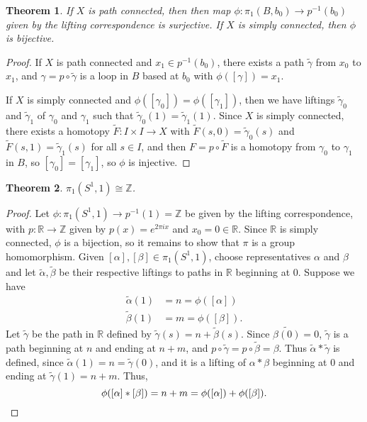 \documentclass[letterpaper,12pt]{article}
\newtheorem{theorem}{Theorem}
\newcommand{\R}{\mathbb{R}}
\newcommand{\Z}{\mathbb{Z}}
\begin{document}
\begin{theorem}
 If $X$ is path connected, then then map $\phi:\pi_1(B,b_0)\to p^{-1}(b_0)$ given by the lifting correspondence is surjective. If $X$ is simply connected, then $\phi$ is bijective.
\end{theorem}
\begin{proof}
 If $X$ is path connected and $x_1\in p^{-1}(b_0)$, there exists a path $\tilde{\gamma}$ from $x_0$ to $x_1$, and $\gamma = p\circ\tilde{\gamma}$ is a loop in $B$ based at $b_0$ with $\phi([\gamma])=x_1$.

 If $X$ is simply connected and $\phi([\gamma_0])=\phi([\gamma_1])$, then we have liftings $\tilde{\gamma}_0$ and $\tilde{\gamma}_1$ of $\gamma_0$ and $\gamma_1$ such that $\tilde{\gamma}_0(1)=\tilde{\gamma}_1(1)$. Since $X$ is simply connected, there exists a homotopy $\tilde{F}:I\times I\to X$ with $\tilde{F}(s,0)=\tilde{\gamma}_0(s)$ and $\tilde{F}(s,1)=\tilde{\gamma}_1(s)$ for all $s\in I$, and then $F = p\circ\tilde{F}$ is a homotopy from $\gamma_0$ to $\gamma_1$ in $B$, so $[\gamma_0]=[\gamma_1]$, so $\phi$ is injective.
\end{proof}
\newpage
\begin{theorem}
 $\pi_1(S^1,1)\cong \Z$.
\end{theorem}
\begin{proof}
 Let $\phi:\pi_1(S^1,1)\to p^{-1}(1)=\Z$ be given by the lifting correspondence, with $p:\R\to \Z$ given by $p(x)=e^{2\pi i x}$ and $x_0=0\in \R$. Since $\R$ is simply connected, $\phi$ is a bijection, so it remains to show that $\pi$ is a group homomorphism. Given $[\alpha],[\beta]\in \pi_1(S^1,1)$, choose representatives $\alpha$ and $\beta$ and let $\tilde{\alpha},\tilde{\beta}$ be their respective liftings to paths in $\R$ beginning at $0$. Suppose we have
\begin{align*}
 \tilde{\alpha}(1) &= n = \phi([\alpha])\\
 \tilde{\beta}(1) &= m = \phi([\beta]).
\end{align*}
Let $\tilde{\gamma}$ be the path in $\R$ defined by $\tilde{\gamma}(s) = n+\tilde{\beta}(s)$. Since $\tilde{\beta(0)}=0$, $\tilde{\gamma}$ is a path beginning at $n$ and ending at $n+m$, and $p\circ\tilde{\gamma} = p\circ \tilde{\beta}=\beta$. Thus $\tilde{\alpha}\ast\tilde{\gamma}$ is defined, since $\tilde{\alpha}(1)=n=\tilde{\gamma}(0)$, and it is a lifting of $\alpha\ast\beta$ beginning at 0 and ending at $\tilde{\gamma}(1)=n+m$. Thus,
\[
 \phi([\alpha]\ast[\beta]) = n+m = \phi([\alpha])+\phi([\beta]).\qedhere
\]

\end{proof}
\end{document}
